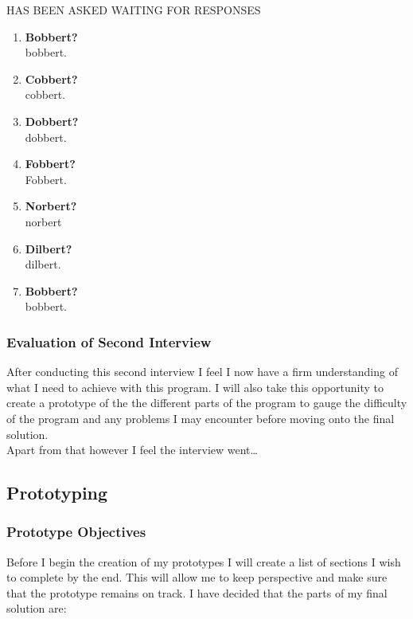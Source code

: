 \begin{flushleft}
            HAS BEEN ASKED WAITING FOR RESPONSES
            \begin{enumerate}
                \item {\bf{Bobbert?}} \\
                \bk
                bobbert.
                \item {\bf{Cobbert?}} \\
                \bk
                cobbert.
                \item {\bf{Dobbert?}} \\
                \bk
                dobbert.
                \item {\bf{Fobbert?}} \\
                \bk
                Fobbert.
                \item {\bf{Norbert?}} \\
                \bk
                norbert
                \item {\bf{Dilbert?}} \\
                \bk
                dilbert.
                \item {\bf{Bobbert?}} \\
                \bk
                bobbert.
            \end{enumerate}

            \subsubsection{Evaluation of Second Interview}
            After conducting this second interview I feel I now have a firm understanding of what I need to achieve with this program. I will also take this opportunity to create a prototype of the 
            the different parts of the program to gauge the difficulty of the program and any problems I may encounter before moving onto the final solution. \\ \bk
            Apart from that however I feel the interview went\dots %

        \subsection{Prototyping}
        \subsubsection{Prototype Objectives} 
        Before I begin the creation of my prototypes I will create a list of sections I wish to complete by the end. This will allow me to keep perspective and make sure that the prototype remains on track. I have decided that the parts of my final solution are:
        

\end{flushleft}

